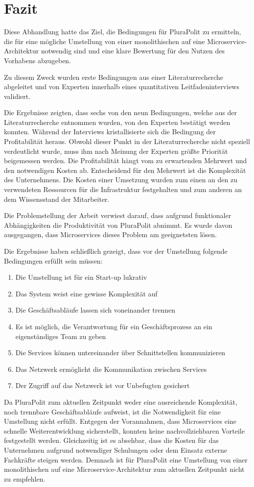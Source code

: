 \section{Fazit}
Diese Abhandlung hatte das Ziel, die Bedingungen für PluraPolit zu ermitteln, die für eine mögliche Umstellung von einer monolithischen auf eine Microservice-Architektur notwendig sind und eine klare Bewertung für den Nutzen des Vorhabens abzugeben. 
 
 Zu diesem Zweck wurden erste Bedingungen aus einer Literaturrecherche abgeleitet und von Experten innerhalb eines quantitativen Leitfadeninterviews validiert.

Die Ergebnisse zeigten, dass sechs von den neun Bedingungen, 
welche aus der Literaturrecherche entnommen wurden, von den Experten bestätigt werden konnten. Während der Interviews kristallisierte sich die Bedingung der Profitabilität heraus. Obwohl dieser Punkt in der Literaturrecherche nicht speziell verdeutlicht wurde, muss ihm nach Meinung der Experten größte Priorität beigemessen werden. Die Profitabilität hängt vom zu erwartenden Mehrwert und den notwendigen Kosten ab. Entscheidend für den Mehrwert ist die Komplexität des Unternehmens. Die Kosten einer Umsetzung wurden zum einen an den zu verwendeten Ressourcen für die Infrastruktur festgehalten und zum anderen an dem Wissensstand der Mitarbeiter.

Die Problemstellung der Arbeit verwiest darauf, dass aufgrund funktionaler Abhängigkeiten die Produktivität von PluraPolit abnimmt. Es wurde davon ausgegangen, dass Microservices dieses Problem am geeignetsten lösen.
 
Die Ergebnisse haben schließlich gezeigt, dass vor der Umstellung folgende Bedingungen erfüllt sein müssen:
\begin{enumerate}
	\item Die Umstellung ist für ein Start-up lukrativ
	\item Das System weist eine gewisse Komplexität auf
	\item Die Geschäftsabläufe lassen sich voneinander trennen
	\item Es ist möglich, die Verantwortung für ein Geschäftsprozess an ein eigenständiges Team zu geben
	\item Die Services können untereinander über Schnittstellen kommunizieren
	\item Das Netzwerk ermöglicht die Kommunikation zwischen Services
	\item Der Zugriff auf das Netzwerk ist vor Unbefugten gesichert
\end{enumerate}

Da PluraPolit zum aktuellen Zeitpunkt weder eine ausreichende Komplexität, noch trennbare Geschäftsabläufe aufweist, ist die Notwendigkeit für eine Umstellung nicht erfüllt. Entgegen der Vorannahmen, dass Microservices eine schnelle Weiterentwicklung sicherstellt, konnten keine nachvollziehbaren Vorteile festgestellt werden. Gleichzeitig ist es absehbar, dass die Kosten für das Unternehmen aufgrund notwendiger Schulungen oder dem Einsatz externe Fachkräfte steigen werden. Demnach ist für PluraPolit eine Umstellung von einer monolithischen auf eine Microservice-Architektur zum aktuellen Zeitpunkt nicht zu empfehlen.

